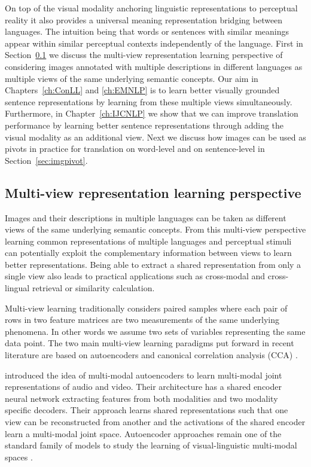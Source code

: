 On top of the visual modality anchoring linguistic representations to perceptual reality it
also provides a universal meaning representation bridging between languages.
The  intuition being that words or sentences with similar meanings appear
within similar perceptual contexts independently of the language.
First in Section~\ref{sec:multiview} we discuss
the multi-view representation learning perspective of considering images annotated
with multiple descriptions in different languages as multiple views of the
same underlying semantic concepts.
Our aim in Chapters~\ref{ch:ConLL} and \ref{ch:EMNLP} is to learn
better visually grounded sentence representations by learning from these multiple views
simultaneously. Furthermore, in Chapter~\ref{ch:IJCNLP} we show that we can improve
translation performance by learning better sentence representations through  adding the visual
modality as an additional view.
Next we discuss how images can be used as pivots in practice for translation on word-level 
and on sentence-level in Section~\ref{sec:imgpivot}.

\subsection{Multi-view representation learning perspective}
\label{sec:multiview}


Images and their descriptions in multiple languages can be taken as different views of the
same underlying semantic concepts. From this multi-view perspective learning common representations
of multiple languages and perceptual stimuli can potentially exploit the complementary information
between views to learn better representations. Being able to extract
a shared representation from only a single view also leads to practical applications such as
cross-modal and cross-lingual retrieval or similarity calculation.

Multi-view learning traditionally considers paired samples
where each pair of rows in two feature matrices
are two measurements of the same
underlying phenomena. In other words we assume two sets of variables representing the
same data point. The two main multi-view learning paradigms put forward in recent literature are based on
autoencoders and canonical correlation analysis (CCA) \citep{wang2015deep}.

\cite{ngiam2011multimodal} introduced the idea
of multi-modal autoencoders to learn multi-modal joint representations of audio and video. Their
architecture has a shared encoder neural network extracting features from both modalities and two
modality specific decoders.  
Their approach learns shared representations such that one view can be reconstructed from another and
the activations of the shared encoder learn a multi-modal joint space.
Autoencoder approaches  remain one of the standard family of models
to study the learning of visual-linguistic multi-modal spaces \citep{silberer2014learning,silberer2017visually,wang2018associative}.


